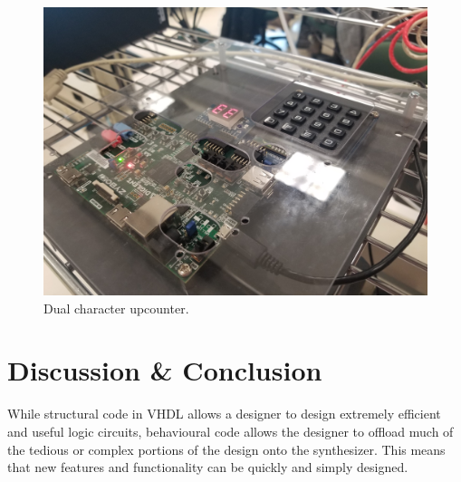 \documentclass{article}
\begin{document}
    
    \begin{figure}[H]
        \includegraphics[width=115mm]{counter_dual.jpg}
        \caption{Dual character upcounter.}
        \label{fig:counter_dual}
    \end{figure}

\section{Discussion & Conclusion}

While structural code in VHDL allows a designer to design extremely efficient and useful
logic circuits, behavioural code allows the designer to offload much of the tedious or complex
portions of the design onto the synthesizer.
This means that new features and functionality can be quickly and simply designed.
\end{document}
